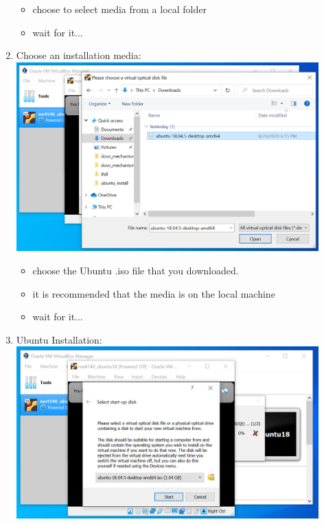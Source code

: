 \documentclass[12pt]{article}
\begin{document}
\begin{description}
\begin{enumerate}
\begin{itemize}
                 \item choose to select media from a local folder 
                 \item wait for it...
                 
            \end{itemize}
	
\item Choose an installation media: \vspace{5mm} \\
      		\hspace*{-2.5cm}\includegraphics[scale=.6]{Capture11.png} \\
               \begin{itemize}
                    
     
                \item choose the Ubuntu .iso file that you downloaded.
                \item it is recommended that the media is on the local machine
                \item wait for it...
                
            \end{itemize}


        
	\newpage
\item Ubuntu Installation: \vspace{20mm} \\
      		\hspace*{-2.5cm}\includegraphics[scale=.6]{Capture12.png}
            \begin{itemize}
                    

\end{itemize}
\end{enumerate}
\end{description}
\end{document}
